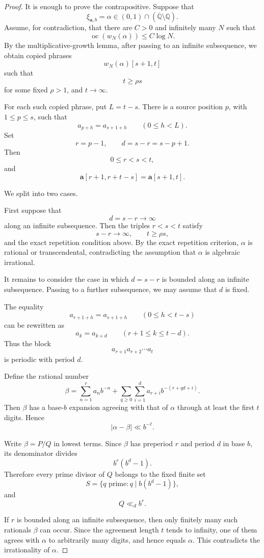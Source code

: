\documentclass[11pt]{amsart}
\theoremstyle{definition}
\DeclareMathOperator{\oc}{oc}
\begin{document}
\begin{proof}
It is enough to prove the contrapositive. Suppose that
\[
\xi_{\mathbf a,b}
=
\alpha
\in (0,1)\cap(\overline{\mathbb Q}\setminus\mathbb Q).
\]
Assume, for contradiction, that there are \(C>0\) and infinitely many \(N\) such that
\[
\oc(w_N(\alpha))\leq C\log N.
\]
By the multiplicative-growth lemma, after passing to an infinite subsequence, we obtain copied phrases
\[
w_N(\alpha)[s+1,t]
\]
such that
\[
t\geq \rho s
\]
for some fixed \(\rho>1\), and \(t\to\infty\).

For each such copied phrase, put \(L=t-s\). There is a source position \(p\), with \(1\leq p\leq s\), such that
\[
a_{p+h}=a_{s+1+h}
\qquad(0\leq h<L).
\]
Set
\[
r=p-1,
\qquad
d=s-r=s-p+1.
\]
Then
\[
0\leq r<s<t,
\]
and
\[
\mathbf a[r+1,r+t-s]
=
\mathbf a[s+1,t].
\]

We split into two cases.

First suppose that
\[
d=s-r\to\infty
\]
along an infinite subsequence. Then the triples \(r<s<t\) satisfy
\[
s-r\to\infty,
\qquad
t\geq \rho s,
\]
and the exact repetition condition above. By the exact repetition criterion, \(\alpha\) is rational or transcendental, contradicting the assumption that \(\alpha\) is algebraic irrational.

It remains to consider the case in which \(d=s-r\) is bounded along an infinite subsequence. Passing to a further subsequence, we may assume that \(d\) is fixed.

The equality
\[
a_{r+1+h}=a_{s+1+h}
\qquad(0\leq h<t-s)
\]
can be rewritten as
\[
a_k=a_{k+d}
\qquad(r+1\leq k\leq t-d).
\]
Thus the block
\[
a_{r+1}a_{r+2}\cdots a_t
\]
is periodic with period \(d\).

Define the rational number
\[
\beta
=
\sum_{n=1}^{r}a_n b^{-n}
+
\sum_{q\geq 0}\sum_{i=1}^{d}
a_{r+i}b^{-(r+qd+i)}.
\]
Then \(\beta\) has a base-\(b\) expansion agreeing with that of \(\alpha\) through at least the first \(t\) digits. Hence
\[
|\alpha-\beta|\ll b^{-t}.
\]

Write \(\beta=P/Q\) in lowest terms. Since \(\beta\) has preperiod \(r\) and period \(d\) in base \(b\), its denominator divides
\[
b^r(b^d-1).
\]
Therefore every prime divisor of \(Q\) belongs to the fixed finite set
\[
S=\{q\text{ prime}:q\mid b(b^d-1)\},
\]
and
\[
Q\ll_d b^r.
\]

If \(r\) is bounded along an infinite subsequence, then only finitely many such rationals \(\beta\) can occur. Since the agreement length \(t\) tends to infinity, one of them agrees with \(\alpha\) to arbitrarily many digits, and hence equals \(\alpha\). This contradicts the irrationality of \(\alpha\).


\end{proof}
\end{document}

